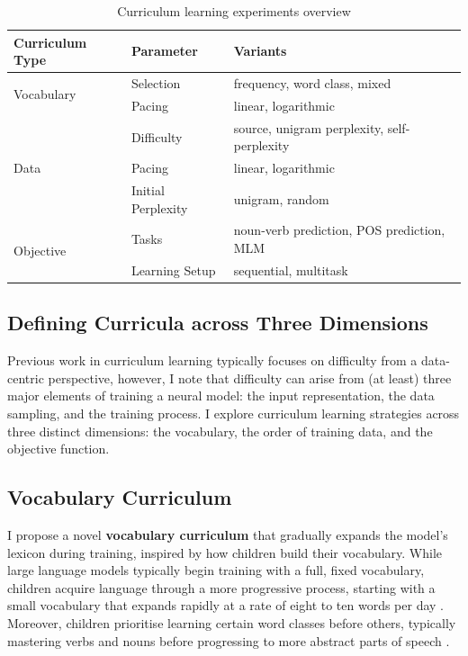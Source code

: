 \begin{table}[H]
    \centering
    \small
    \begin{tabular}{lll}
    \toprule
    \textbf{Curriculum Type} & \textbf{Parameter} &\textbf{Variants} \\
    \midrule
     \multirow{2}{*}{Vocabulary} & Selection & frequency, word class, mixed \\
     & Pacing & linear, logarithmic \\
     \midrule
     \multirow{3}{*}{Data} & Difficulty & source, unigram perplexity, self-perplexity \\
     & Pacing & linear, logarithmic \\
     & Initial Perplexity & unigram, random \\
      \midrule
     \multirow{2}{*}{Objective} & Tasks & noun-verb prediction, POS prediction, MLM\\
     & Learning Setup & sequential, multitask \\
    \bottomrule
    \end{tabular}
    \caption{\label{tbl:configurations} Curriculum learning experiments overview}
\end{table}

\subsection{Defining Curricula across Three Dimensions}
Previous work in curriculum learning typically focuses on difficulty from a data-centric perspective, however, I note that difficulty can arise from (at least) three major elements of training a neural model: the input representation, the data sampling, and the training process. I explore curriculum learning strategies across three distinct dimensions: the vocabulary, the order of training data, and the objective function.

\subsection{Vocabulary Curriculum}
\label{subsec:vocab-cl}

I propose a novel \textbf{vocabulary curriculum} that gradually expands the model's lexicon during training, inspired by how children build their vocabulary. While large language models typically begin training with a full, fixed vocabulary, children acquire language through a more progressive process, starting with a small vocabulary that expands rapidly at a rate of eight to ten words per day \citep{weizman2001lexical}. Moreover, children prioritise learning certain word classes before others, typically mastering verbs and nouns before progressing to more abstract parts of speech \citep{bergelson2015early}.

